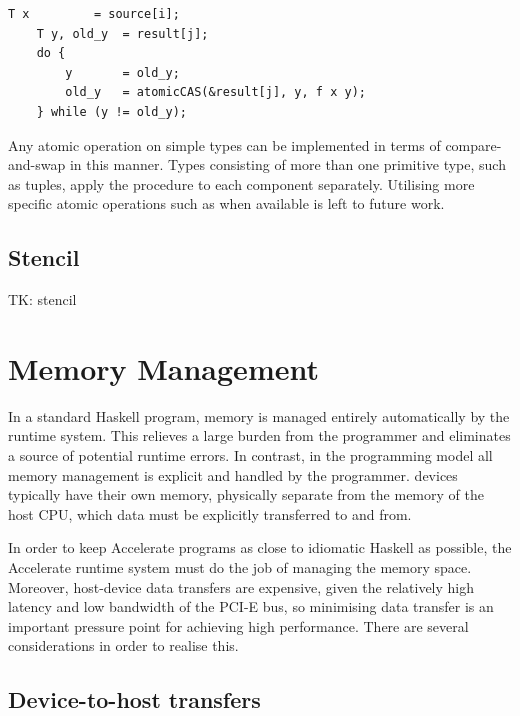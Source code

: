 \begin{lstlisting}[style=cuda]
    T x         = source[i];
    T y, old_y  = result[j];
    do {
        y       = old_y;
        old_y   = atomicCAS(&result[j], y, f x y);
    } while (y != old_y);
\end{lstlisting}
%
Any atomic operation on simple types can be implemented in terms of
compare-and-swap in this manner. Types consisting of more than one primitive
type, such as tuples, apply the procedure to each component separately.
Utilising more specific atomic operations such as  when
available is left to future work.

\subsection{Stencil}

TK: stencil


\section{Memory Management}
\label{sec:memory_management}

In a standard Haskell program, memory is managed entirely automatically by the
runtime system. This relieves a large burden from the programmer and eliminates
a source of potential runtime errors. In contrast, in the \CUDA programming model
all memory management is explicit and handled by the programmer. \CUDA devices
typically have their own memory, physically separate from the memory of the host
CPU, which data must be explicitly transferred to and from.

In order to keep Accelerate programs as close to idiomatic Haskell as possible,
the Accelerate runtime system must do the job of managing the \CUDA memory
space. Moreover, host-device data transfers are expensive, given the relatively
high latency and low bandwidth of the PCI-E bus, so minimising data transfer is
an important pressure point for achieving high performance. There are several
considerations in order to realise this.



\subsection{Device-to-host transfers}

